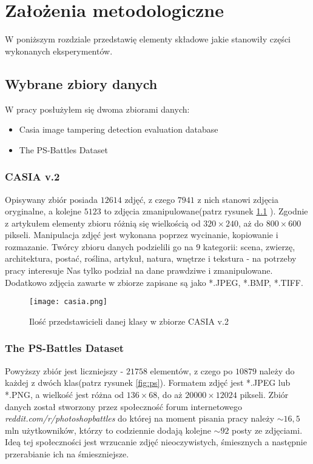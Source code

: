 \chapter{Założenia metodologiczne}

W poniższym rozdziale przedstawię elementy składowe jakie stanowiły części wykonanych eksperymentów.

\section{Wybrane zbiory danych}

W pracy posłużyłem się dwoma zbiorami danych:
\begin{itemize}
	\item Casia image tampering detection evaluation database \cite{casia}
	\item The PS-Battles Dataset \cite{ps}
\end{itemize}

\subsection{CASIA v.2}

Opisywany zbiór posiada $12 614$ zdjęć, z czego $7 941$ z nich stanowi zdjęcia oryginalne, a kolejne $5 123$ to zdjęcia zmanipulowane(patrz rysunek \ref{fig:casia} ). Zgodnie z artykułem \cite{casia} elementy zbioru różnią się wielkością od $320 \times 240$, aż do $800 \times 600$ pikseli. Manipulacja zdjęć jest wykonana poprzez wycinanie, kopiowanie i rozmazanie. Twórcy zbioru danych podzielili go na $9$ kategorii: scena, zwierzę, architektura, postać, roślina, artykuł, natura, wnętrze i tekstura - na potrzeby pracy interesuje Nas tylko podział na dane prawdziwe i zmanipulowane. Dodatkowo zdjęcia zawarte w zbiorze zapisane są jako *.JPEG, *.BMP, *.TIFF.

\begin{figure}[h!]
	\texttt{[image: casia.png]}
	\centering
	\caption{Ilość przedstawicieli danej klasy w zbiorze CASIA v.2}
	\label{fig:casia}
\end{figure}

\subsection{The PS-Battles Dataset}

Powyższy zbiór jest liczniejszy - $21 758$ elementów, z czego po $10 879$ należy do każdej z dwóch klas(patrz rysunek \ref{fig:ps}). Formatem zdjęć jest *.JPEG lub *.PNG, a wielkość jest różna od $136 \times 68$, do aż $20 000 \times 12 024$ pikseli. Zbiór danych został stworzony przez społeczność forum internetowego \textit{reddit.com/r/photoshopbattles} do której na moment pisania pracy należy $\sim16,5$ mln użytkowników, którzy to codziennie dodają kolejne $\sim92$ posty ze zdjęciami. Ideą tej społeczności jest wrzucanie zdjęć nieoczywistych, śmiesznych a następnie przerabianie ich na śmieszniejsze.

